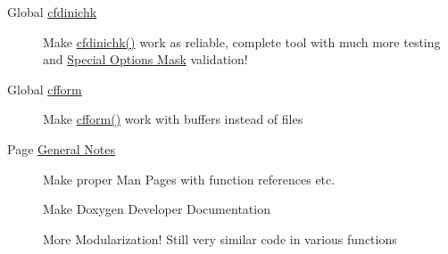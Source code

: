 \label{todo__todo000001}
\hypertarget{todo__todo000001}{}
 \begin{description}
\item[Global \hyperlink{group__advanced__features_g35e2c28f591ac71e3617c612233ecdd0}{cfdinichk} ]Make \hyperlink{group__advanced__features_g35e2c28f591ac71e3617c612233ecdd0}{cfdinichk()} work as reliable, complete tool with much more testing and \hyperlink{group__special__options__mask}{Special Options Mask} validation!

\end{description}


\label{todo__todo000003}
\hypertarget{todo__todo000003}{}
 \begin{description}
\item[Global \hyperlink{group__report__generation_g2f8350e7d032c87b2a0e1cb6149a85ec}{cfform} ]Make \hyperlink{group__report__generation_g2f8350e7d032c87b2a0e1cb6149a85ec}{cfform()} work with buffers instead of files

\end{description}


\label{todo__todo000002}
\hypertarget{todo__todo000002}{}
 \begin{description}
\item[Page \hyperlink{properties}{General Notes} ]Make proper Man Pages with function references etc. 

Make Doxygen Developer Documentation 

More Modularization! Still very similar code in various functions \end{description}
